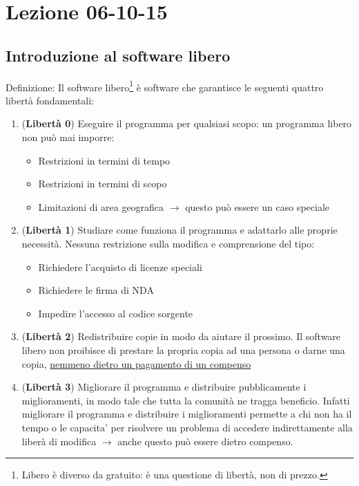 \section{Lezione 06-10-15}

\subsection{Introduzione al software libero}

Definizione: Il software libero\footnote{Libero \`e diverso da gratuito: è una questione di libertà, non di prezzo.} \`e software che garantisce le seguenti quattro libert\`a fondamentali:

\begin{enumerate}

\item (\textbf{Libertà 0}) Eseguire il programma per qualsiasi scopo: un programma libero non pu\`o mai imporre:

  \begin{itemize}

  \item Restrizioni in termini di tempo
  \item Restrizioni in termini di scopo
  \item Limitazioni di area geografica $\to$ questo pu\`o essere un caso speciale

  \end{itemize}

\item (\textbf{Libertà 1}) Studiare come funziona il programma e adattarlo alle proprie necessit\`a.
Nessuna restrizione sulla modifica e comprensione del tipo:

  \begin{itemize}

  \item Richiedere l'acquisto di licenze speciali
  \item Richiedere le firma di NDA
  \item Impedire l'accesso al codice sorgente

  \end{itemize}

\item (\textbf{Libertà 2}) Redistribuire copie in modo da aiutare il prossimo. Il software libero non proibisce di prestare la propria copia ad una persona o darne una copia, \underline{nemmeno dietro un pagamento di un compenso}

  \item (\textbf{Libertà 3}) Migliorare il programma e distribuire pubblicamente i miglioramenti, in modo tale che tutta la comunit\`a ne tragga beneficio. Infatti migliorare il programma e distribuire i miglioramenti permette a chi non ha il tempo o le capacita' per risolvere un problema di accedere indirettamente alla liber\`a di modifica $\to$ anche questo pu\`o essere dietro compenso.

\end{enumerate}

